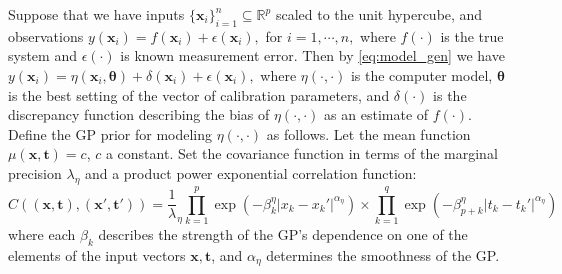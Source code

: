 \documentclass{article}
\begin{document}
Suppose that we have inputs $\{\mathbf x_i\}_{i=1}^n\subseteq \mathbb R^p$ scaled to the unit hypercube, and observations 
%
$y(\mathbf x_i) = f(\mathbf x_i) + \epsilon(\mathbf x_i),$ for $i=1,\cdots,n,$
%
where $f(\cdot)$ is the true system and $\epsilon(\cdot)$ is known measurement error. 
%
Then by \eqref{eq:model_gen} we have
%
$y(\mathbf x_i) = \eta(\mathbf x_i,\boldsymbol \theta) + \delta(\mathbf x_i) + \epsilon(\mathbf x_i),$
%
where $\eta(\cdot,\cdot)$ is the computer model, $\boldsymbol \theta$ is the best %
setting of the vector of calibration parameters, and $\delta(\cdot)$ is the discrepancy function describing the bias of $\eta(\cdot,\cdot)$ as an estimate of $f(\cdot)$.
Define the GP prior for modeling $\eta(\cdot,\cdot)$ as follows. 
%
Let the mean function $\mu(\mathbf x,\mathbf t)=c$, $c$ a constant. 
%
Set the covariance function in terms of the marginal precision $\lambda_\eta$ and a product power exponential correlation function:
%
\begin{equation}\label{eq:Hig_cov}
C((\mathbf x,\mathbf t),(\mathbf x',\mathbf t')) = \frac 1\lambda_\eta \prod_{k=1}^{p}
\exp \left(-\beta^\eta_k|x_k-x_k'|^{\alpha_\eta}\right) \times
\prod_{k=1}^{q}
\exp \left(-\beta^\eta_{p+k}|t_k-t_k'|^{\alpha_\eta}\right)
\end{equation}
%
where each $\beta_k$ describes the strength of the GP's dependence on one of the elements of the input vectors $\mathbf x,\mathbf t$, and $\alpha_\eta$ determines the smoothness of the GP. 
\end{document}

